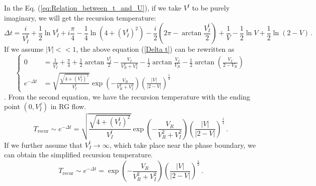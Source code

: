 \documentclass[aps,onecolumn,nofootinbib,superscriptaddress,notitlepage,longbibliography]{revtex4-1}
\begin{document}
In the Eq. (\ref{eq:Relation_between_t_and_U}), if we take $V^{\mathrm{f}}$
to be purely imaginary, we will get the recursion temperature: 
\begin{equation}
\Delta t=\frac{i}{V_{I}^{\mathrm{f}}}+\frac{1}{2}\ln V_{I}^{\mathrm{f}}+i\frac{\pi}{4}-\frac{1}{4}\ln(4+(V_{I}^{\mathrm{f}})^{2})-\frac{i}{2}(2\pi-\arctan\frac{V_{I}^{\mathrm{f}}}{2})+\frac{1}{V}-\frac{1}{2}\ln V+\frac{1}{2}\ln(2-V)\,.\label{Delta t}
\end{equation}
If we assume $|V|<<1$, the above equation (\ref{Delta t}) can be
rewritten as 
\begin{equation}
\begin{cases}
0 & =\frac{1}{V_{I}^{\mathrm{f}}}+\frac{\pi}{4}+\frac{1}{2}\arctan\frac{V_{I}^{\mathrm{f}}}{2}-\frac{V_{I}}{V_{R}^{2}+V_{I}^{2}}-\frac{1}{2}\arctan\frac{V_{I}}{V_{R}}-\frac{1}{2}\arctan(\frac{V_{I}}{2-V_{R}})\\
e^{-\Delta t} & =\sqrt{\frac{\sqrt{4+(V_{I}^{\mathrm{f}})^{2}}}{V_{I}^{\mathrm{f}}}}\exp(-\frac{V_{R}}{V_{R}^{2}+V_{I}^{2}})(\frac{|V|}{|2-V|})^{\frac{1}{2}}
\end{cases}
\end{equation}
. From the second equation, we have the recursion temperature with
the ending point $(0,V_{I}^{f})$ in RG flow. 
\begin{equation}
T_{\mathrm{recur}}\sim e^{-\Delta t}=\sqrt{\frac{\sqrt{4+(V_{I}^{\mathrm{f}})^{2}}}{V_{I}^{\mathrm{f}}}}\exp(-\frac{V_{R}}{V_{R}^{2}+V_{I}^{2}})(\frac{|V|}{|2-V|})^{\frac{1}{2}}\,.
\end{equation}
If we further assume that $V_{I}^{\mathrm{f}}\to\infty$, which take
place near the phase boundary, we can obtain the simplified recursion
temperature. 
\begin{equation}
T_{\mathrm{recur}}\sim e^{-\Delta t}=\exp(-\frac{V_{R}}{V_{R}^{2}+V_{I}^{2}})(\frac{|V|}{|2-V|})^{\frac{1}{2}}\,.
\end{equation}
\end{document}
